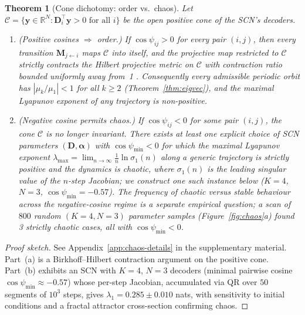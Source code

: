 \documentclass[12pt]{article}
\newcommand{\vv}[1]{\mathbf{#1}}
\newcommand{\DD}{\vv{D}}
\newcommand{\yy}{\vv{y}}
\newcommand{\RR}{\mathbb{R}}
\newtheorem{theorem}{Theorem}
\begin{document}
\begin{theorem}[Cone dichotomy: order vs.\ chaos]\label{thm:cone}
Let $\mathcal{C}=\{\yy\in\RR^N:\DD_i^\top\yy>0\text{ for all }i\}$ be the open positive cone of the SCN's decoders.
\begin{enumerate}[label=(\alph*)]
\item \emph{(Positive cosines $\Rightarrow$ order.)} If $\cos\psi_{ij}>0$ for every pair $(i,j)$, then every transition $\vv{M}_{j\leftarrow i}$ maps $\mathcal{C}$ into itself, and the projective map restricted to $\mathcal{C}$ strictly contracts the Hilbert projective metric on $\mathcal{C}$ with contraction ratio bounded uniformly away from~1 \citep{birkhoff1957extensions,bushell1973hilbert}. Consequently every admissible periodic orbit has $|\mu_k/\mu_1|<1$ for all $k\geq 2$ (Theorem~\ref{thm:eigvec}), and the maximal Lyapunov exponent of any trajectory is non-positive.
\item \emph{(Negative cosine permits chaos.)} If $\cos\psi_{ij}<0$ for some pair $(i,j)$, the cone $\mathcal{C}$ is no longer invariant. There exists at least one explicit choice of SCN parameters $(\DD,\boldsymbol{\alpha})$ with $\cos\psi_{\min}<0$ for which the maximal Lyapunov exponent $\lambda_{\max}=\lim_{n\to\infty}\frac{1}{n}\ln\sigma_1(n)$ along a generic trajectory is strictly positive and the dynamics is chaotic, where $\sigma_1(n)$ is the leading singular value of the $n$-step Jacobian; we construct one such instance below ($K=4$, $N=3$, $\cos\psi_{\min}=-0.57$). The frequency of chaotic versus stable behaviour across the negative-cosine regime is a separate empirical question; a scan of $800$ random $(K{=}4, N{=}3)$ parameter samples (Figure~\ref{fig:chaos}a) found 3 strictly chaotic cases, all with $\cos\psi_{\min}<0$.
\end{enumerate}
\end{theorem}
\begin{proof}[Proof sketch] See Appendix~\ref{app:chaos-details} in the supplementary material. Part~(a) is a Birkhoff--Hilbert contraction argument on the positive cone. Part~(b) exhibits an SCN with $K=4$, $N=3$ decoders (minimal pairwise cosine $\cos\psi_{\min}\approx-0.57$) whose per-step Jacobian, accumulated via QR over $50$ segments of $10^3$ steps, gives $\lambda_1=0.285\pm 0.010$ nats, with sensitivity to initial conditions and a fractal attractor cross-section confirming chaos.\end{proof}
\end{document}
